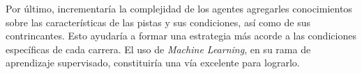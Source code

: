 \documentclass[12pt, letterpaper,spanish]{article}
\theoremstyle{definition}
\theoremstyle{remark}
\begin{document}
	Por último, incrementaría la complejidad de los agentes agregarles conocimientos sobre las características de las pistas y sus condiciones, así como de sus contrincantes. Esto ayudaría a formar una estrategia más acorde a las condiciones específicas de cada carrera. El uso de \emph{Machine Learning}, en su rama de aprendizaje supervisado, constituiría una vía excelente para lograrlo. 

\pagebreak


\end{document}
